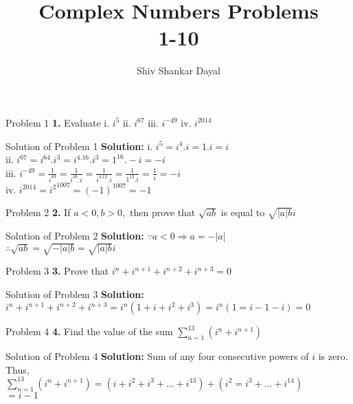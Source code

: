 \documentclass[aspectratio=169,8pt]{beamer}
\title{Complex Numbers Problems\\ 1-10}
\author[Shiv Shankar Dayal]{Shiv Shankar Dayal}
\begin{document}
\begin{frame}
  \titlepage
\end{frame}
\begin{frame}{Problem 1}
  \textbf{1.} Evaluate i. $i^5$ ii. $i^{67}$ iii. $i^{-49}$ iv. $i^{2014}$
\end{frame}
\begin{frame}{Solution of Problem 1}
  \textbf{Solution:} i. $i^5 = i^4.i = 1.i = i$\\
  \vspace*{0.2cm}
  ii. $i^{67} = i^{64}.i^3 = i^{4.16}.i^3 = 1^{16}.-i = -i$\\
  \vspace*{0.2cm}
  iii. $i^{-49} = \frac{1}{i^{49}} = \frac{1}{i^{48}.i} = \frac{1}{i^{4.12}.i}
  = \frac{1}{1^{12}.i} = \frac{1}{i} = -i$\\
  \vspace*{0.2cm}
  iv. $i^{2014} = {i^2}^1007 = (-1)^{1007} = -1$
\end{frame}
\begin{frame}{Problem 2}
  \textbf{2.} If $a<0, b>0,$ then prove that $\sqrt{ab}$ is equal to $\sqrt{|a|b}i$
\end{frame}
\begin{frame}{Solution of Problem 2}
  \textbf{Solution:} $\because a < 0 \Rightarrow a = -|a|$\\
  \vspace*{0.2cm}
  $\therefore \sqrt{ab} = \sqrt{-|a|b} = \sqrt{|a|b}i$
\end{frame}
\begin{frame}{Problem 3}
  \textbf{3.} Prove that $i^n + i^{n + 1} + i^{n + 2} + i^{n+ 3} = 0$
\end{frame}
\begin{frame}{Solution of Problem 3}
  \textbf{Solution:} $i^n + i^{n + 1} + i^{n + 2} + i^{n+ 3} = i^n(1 + i + i^2 + i^3) = i^n(1 = i - 1 - i) = 0$
\end{frame}
\begin{frame}{Problem 4}
  \textbf{4.} Find the value of the sum $\sum_{n=1}^{13}(i^n + i^{n + 1})$
\end{frame}
\begin{frame}{Solution of Problem 4}
  \textbf{Solution:} Sum of any four consecutive powers of $i$ is zero. Thus,\\
  \vspace*{0.2cm}
  $\sum_{n=1}^{13}(i^n + i^{n + 1}) = (i + i^2 + i^3 + \ldots + i^{13}) + (i^2 = i^3 + \ldots + i^{14})$\\
  \vspace*{0.2cm}
  $= i - 1$
\end{frame}
\end{document}
